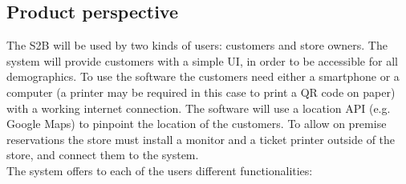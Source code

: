 \subsection{Product perspective}
The S2B will be used by two kinds of users: customers and store owners. The system will provide customers with a simple UI, in order to be accessible for all demographics. To use the software the customers need either a smartphone or a computer (a printer may be required in this case to print a QR code on paper) with a working internet connection. The software will use a location API (e.g. Google Maps) to pinpoint the location of the customers. To allow on premise reservations the store must install a monitor and a ticket printer outside of the store, and connect them to the system.\\
The system offers to each of the users different functionalities:
